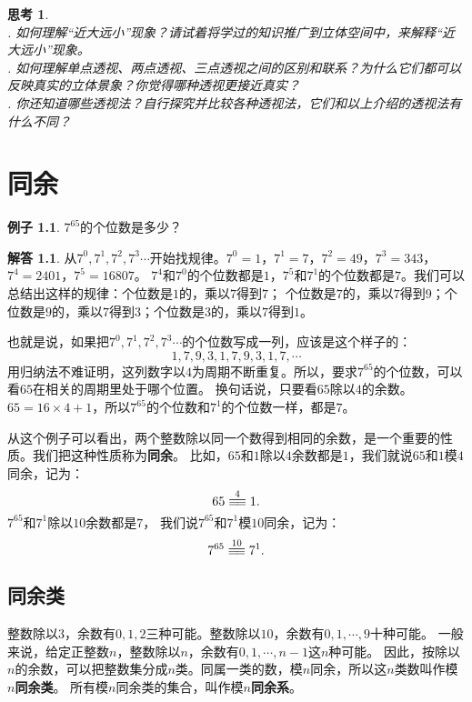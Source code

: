 \documentclass[12pt,UTF8]{ctexbook}
\theoremstyle{definition}
\newtheorem{ex}{例子}[section]
\newtheorem*{so}{解答}
\theoremstyle{plain}
\newtheorem{sk}{思考}[section]
\newcommand{\tong}[1]{\overset{#1}{\equiv\joinrel\equiv}}
\begin{document}
\begin{sk}
    \mbox{}\\
    . 如何理解“近大远小”现象？请试着将学过的知识推广到立体空间中，来解释“近大远小”现象。\\
    . 如何理解单点透视、两点透视、三点透视之间的区别和联系？为什么它们都可以反映真实的立体景象？你觉得哪种透视更接近真实？\\
    . 你还知道哪些透视法？自行探究并比较各种透视法，它们和以上介绍的透视法有什么不同？
\end{sk}

\chapter{同余}
\begin{ex}\label{ex:3-0-0}
    $7^{65}$的个位数是多少？
\end{ex}
\begin{so}
    从$7^0,7^1,7^2,7^3\cdots$开始找规律。$7^0=1$，$7^1=7$，$7^2=49$，$7^3=343$，$7^4=2401$，$7^5=16807$。
    $7^4$和$7^0$的个位数都是$1$，$7^5$和$7^1$的个位数都是$7$。我们可以总结出这样的规律：个位数是$1$的，乘以$7$得到$7$；
    个位数是$7$的，乘以$7$得到$9$；个位数是$9$的，乘以$7$得到$3$；个位数是$3$的，乘以$7$得到$1$。

    也就是说，如果把$7^0,7^1,7^2,7^3\cdots$的个位数写成一列，应该是这个样子的：
    $$ 1, 7, 9, 3, 1, 7, 9, 3, 1, 7, \cdots$$
    用归纳法不难证明，这列数字以$4$为周期不断重复。所以，要求$7^{65}$的个位数，可以看$65$在相关的周期里处于哪个位置。
    换句话说，只要看$65$除以$4$的余数。$65 = 16 \times 4 + 1$，所以$7^{65}$的个位数和$7^1$的个位数一样，都是$7$。
\end{so}

从这个例子可以看出，两个整数除以同一个数得到相同的余数，是一个重要的性质。我们把这种性质称为\textbf{同余}。
比如，$65$和$1$除以$4$余数都是$1$，我们就说$65$和$1$模$4$同余，记为：
$$ 65 \tong{4} 1. $$
$7^{65}$和$7^1$除以$10$余数都是$7$，
我们说$7^{65}$和$7^1$模$10$同余，记为：
$$ 7^{65} \tong{10} 7^1. $$  %

\section{同余类}
整数除以$3$，余数有$0,1,2$三种可能。整数除以$10$，余数有$0,1,\cdots , 9$十种可能。
一般来说，给定正整数$n$，整数除以$n$，余数有$0,1,\cdots , n-1$这$n$种可能。
因此，按除以$n$的余数，可以把整数集分成$n$类。同属一类的数，模$n$同余，所以这$n$类数叫作模$n$\textbf{同余类}。
所有模$n$同余类的集合，叫作模$n$\textbf{同余系}。
\end{document}
